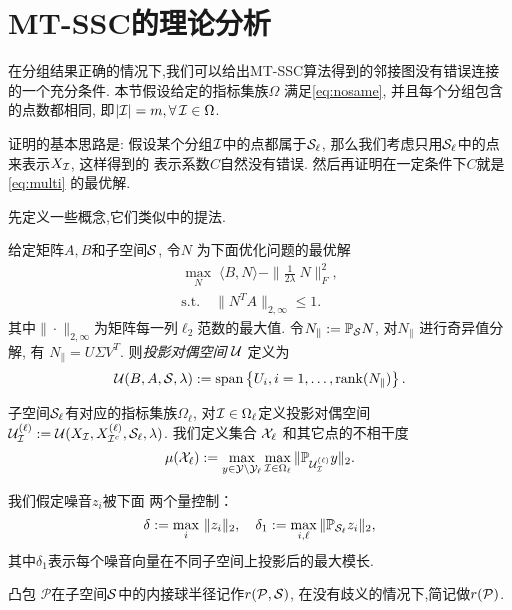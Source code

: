 \section{MT-SSC的理论分析}\label{sec:proof_multi}
在分组结果正确的情况下,我们可以给出MT-SSC算法得到的邻接图没有错误连接
的一个充分条件. 本节假设给定的指标集族\(\Omega\) 满足\eqref{eq:nosame},  
并且每个分组包含的点数都相同, 即\(|\mathcal{I}|=m, \forall\, \mathcal{I} \in \Omega\).

证明的基本思路是: 假设某个分组\(\mathcal{I}\)中的点都属于\(\mathcal{S}_\ell\),
那么我们考虑只用\(\mathcal{S}_\ell\)中的点来表示\(X_{\mathcal{I}}\), 这样得到的
表示系数\(C\)自然没有错误. 然后再证明在一定条件下\(C\)就是\eqref{eq:multi} 
的最优解.

先定义一些概念,它们类似\cite{soltanolkotabi2012geometric}中的提法.
\begin{definition}[投影对偶空间]\label{def:proj_dual_direction}
  给定矩阵\(A,B\)和子空间\(\mathcal{S}\), 令\(N\) 为下面优化问题的最优解
  \begin{gather*}
    \max_{N} \; \langle B, N \rangle - \|\frac{1}{2\lambda}\ N\|_F^2,\\
    \text{s.t.}\quad \|N^T A\|_{2, \infty} \leq 1.
  \end{gather*}
  其中\(\|\cdot\|_{2,\infty}\)为矩阵每一列\(\ell_2\)范数的最大值.
  令\( N_\parallel := \mathbb{P}_{\mathcal{S}} N\), 对\(N_\parallel\) 进行奇异值分解, 有
  \( N_\parallel = U \Sigma V^T\). 则\emph{投影对偶空间} \(\mathcal{U}\) 定义为
  \[\mathcal{U}(B,A,\mathcal{S},\lambda):= \operatorname{span} \left\{U_i, i = 1,\ldots, \operatorname{rank}(N_\parallel)
  \right\}.\]
\end{definition}

\begin{definition}[子空间的不相干度]\label{def:incoherence}
  子空间\(\mathcal{S}_\ell\)有对应的指标集族\(\Omega_\ell\), 
  对\(\mathcal{I}\in \Omega_\ell\)定义投影对偶空间 \(\mathcal{U}_{\mathcal{I}}^{(\ell)}:=\mathcal{U}(X_{\mathcal{I}},
  X_{\mathcal{I}^c}^{(\ell)},\mathcal{S}_{\ell},\lambda)\).
  我们定义集合 \(\mathcal{X}_\ell\) 和其它点的不相干度
  \[
     \mu(\mathcal{X}_{\ell}) := \max_{y\in \mathcal{Y}\setminus \mathcal{Y}_{\ell}}
     \max_{\mathcal{I} \in \Omega_\ell} \|\mathbb{P}_{\mathcal{U}_{\mathcal{I}}^{(\ell)}} y\|_2. 
   \]
\end{definition} 

\begin{definition}[控制噪音]\label{def:noise} 
  我们假定噪音\(z_i\)被下面 两个量控制： 
  \[ \delta:=\max_i\, \|z_i\|_2, \quad \delta_1:=\max_{i,\ell} \|\mathbb{P}_{\mathcal{S}_\ell} z_i\|_2,\]
其中\(\delta_1\)表示每个噪音向量在不同子空间上投影后的最大模长.  
\end{definition} 

\begin{definition}[内接球半径] 凸包 \(\mathcal{P}\)在子空间\(\mathcal{S}\)中的内接球半径记作\(r(\mathcal{P},\mathcal{S})\),
  在没有歧义的情况下,简记做\(r(\mathcal{P})\). 
\end{definition}

